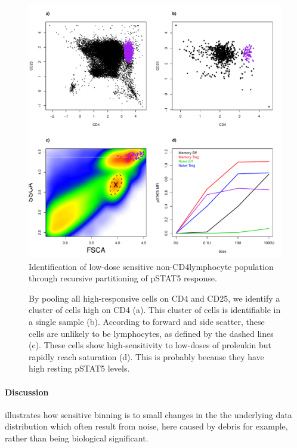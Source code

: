 \hspace{-2cm}
\begin{figure}[h]
\centering
\includegraphics[scale=.5]{figures/new-cell-subset.pdf}
{ Identification of low-dose sensitive non-CD4\positive lymphocyte population through recursive partitioning of pSTAT5 response. }
{
  By pooling all high-responsive cells on CD4 and CD25, we identify a cluster of cells high on CD4 (a).
  This cluster of cells is identifiable in a single sample (b).
  According to forward and side scatter, these cells are unlikely to be lymphocytes, as defined by the dashed lines (c).
  These cells show high-sensitivity to low-doses of proleukin but rapidly reach saturation (d).
  This is probably because they have high resting pSTAT5 levels.
  
}
\end{figure}

\paragraph{Discussion}

 illustrates how sensitive binning is to
small changes in the the underlying data distribution 
which often result from noise, here caused by debris for example,
rather than being biological significant.

